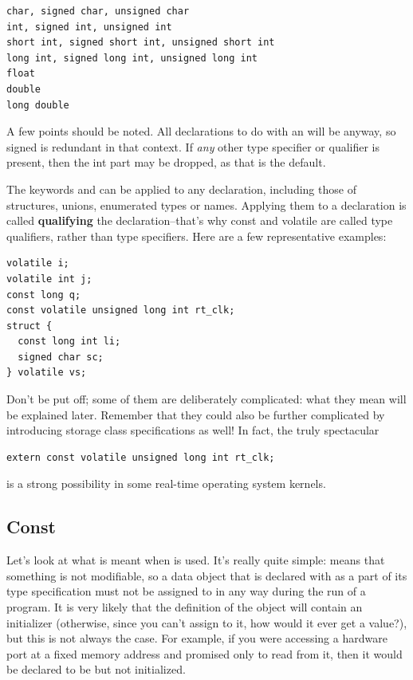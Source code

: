 \begin{Verbatim}
char, signed char, unsigned char
int, signed int, unsigned int
short int, signed short int, unsigned short int
long int, signed long int, unsigned long int
float
double
long double
\end{Verbatim}

  A few points should be noted. All declarations to do with an
   \kint{} will be \signed{} anyway, so signed is
   redundant in that context. If \textit{any} other type specifier or
   qualifier is present, then the int part may be dropped, as that is the
   default.


  The keywords \const{} and \volatile{} can be
   applied to any declaration, including those of structures, unions,
   enumerated types or \typedef{} names. Applying them to
   a declaration is called \textbf{qualifying} the declaration--that's
   why const and volatile are called type qualifiers, rather than type
   specifiers. Here are a few representative examples:


\begin{Verbatim}
volatile i;
volatile int j;
const long q;
const volatile unsigned long int rt_clk;
struct {
  const long int li;
  signed char sc;
} volatile vs;
\end{Verbatim}

  Don't be put off; some of them are deliberately complicated: what they
   mean will be explained later. Remember that they could also be further
   complicated by introducing storage class specifications as well! In fact,
   the truly spectacular


\begin{Verbatim}
extern const volatile unsigned long int rt_clk;
\end{Verbatim}

  is a strong possibility in some real-time operating system kernels.


  \subsection{Const}
   

   Let's look at what is meant when \const{} is used. It's
    really quite simple: \const{} means that something is not
    modifiable, so a data object that is declared with \const{} as
    a part of its type specification must not be assigned to in any way
    during the run of a program. It is very likely that the definition of
    the object will contain an initializer (otherwise, since you can't
    assign to it, how would it ever get a value?), but this is not always
    the case. For example, if you were accessing a hardware port at a fixed
    memory address and promised only to read from it, then it would be
    declared to be \const{} but not initialized.


